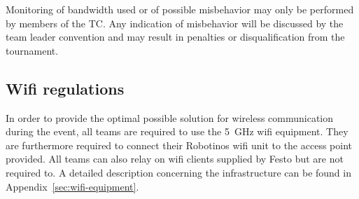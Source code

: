 \documentclass[12pt,twoside]{article}
\newenvironment{rulechange}{}{}
\begin{document}
Monitoring of bandwidth used or of possible misbehavior may only be
performed by members of the TC.
Any indication of misbehavior will be discussed by the team leader
convention and may result in penalties or disqualification from the
tournament.



\subsection{Wifi regulations}
\label{sec:wifi-regulations}
In order to provide the optimal possible solution for wireless
communication during the event, all teams are required to use the
\SI{5}{\giga\hertz} wifi equipment. They are furthermore required to
connect their Robotinos wifi unit to the access point provided. All
teams can also relay on wifi clients supplied by Festo but are not
required to. A detailed description concerning the infrastructure can
be found in Appendix~\ref{sec:wifi-equipment}.


\end{document}
